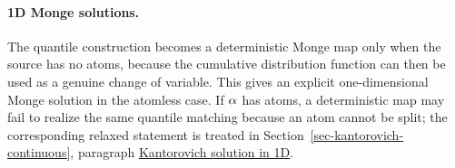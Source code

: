 \paragraph{1D Monge solutions.}\label{par-1d-monge-solution}

The quantile construction becomes a deterministic Monge map only when the source has no atoms, because the cumulative distribution function can then be used as a genuine change of variable. This gives an explicit one-dimensional Monge solution in the atomless case. If $\alpha$ has atoms, a deterministic map may fail to realize the same quantile matching because an atom cannot be split; the corresponding relaxed statement is treated in Section~\ref{sec-kantorovich-continuous}, paragraph \hyperref[sec-1d-kantorovich-solution]{Kantorovich solution in 1D}.

